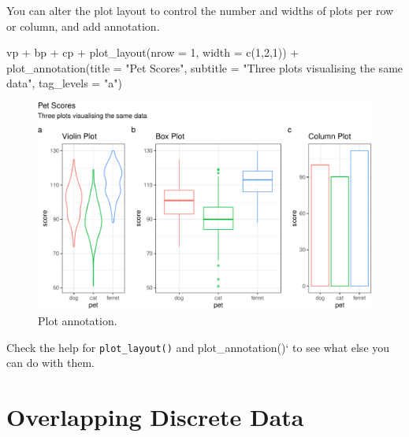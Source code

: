 \documentclass[
  oneside]{book}
\newenvironment{Shaded}{\begin{snugshade}}{\end{snugshade}}
\newcommand{\AttributeTok}[1]{\textcolor[rgb]{0.77,0.63,0.00}{#1}}
\newcommand{\DecValTok}[1]{\textcolor[rgb]{0.00,0.00,0.81}{#1}}
\newcommand{\FunctionTok}[1]{\textcolor[rgb]{0.00,0.00,0.00}{#1}}
\newcommand{\NormalTok}[1]{#1}
\newcommand{\SpecialCharTok}[1]{\textcolor[rgb]{0.00,0.00,0.00}{#1}}
\newcommand{\StringTok}[1]{\textcolor[rgb]{0.31,0.60,0.02}{#1}}
\begin{document}
You can alter the plot layout to control the number and widths of plots per row or column, and add annotation.

\begin{Shaded}
\begin{Highlighting}[]
\NormalTok{vp }\SpecialCharTok{+}\NormalTok{ bp }\SpecialCharTok{+}\NormalTok{ cp }\SpecialCharTok{+} 
  \FunctionTok{plot\_layout}\NormalTok{(}\AttributeTok{nrow =} \DecValTok{1}\NormalTok{, }\AttributeTok{width =} \FunctionTok{c}\NormalTok{(}\DecValTok{1}\NormalTok{,}\DecValTok{2}\NormalTok{,}\DecValTok{1}\NormalTok{)) }\SpecialCharTok{+}
  \FunctionTok{plot\_annotation}\NormalTok{(}\AttributeTok{title =} \StringTok{"Pet Scores"}\NormalTok{,}
                  \AttributeTok{subtitle =} \StringTok{"Three plots visualising the same data"}\NormalTok{,}
                  \AttributeTok{tag\_levels =} \StringTok{"a"}\NormalTok{)}
\end{Highlighting}
\end{Shaded}

\begin{figure}

{\centering \includegraphics[width=0.9\linewidth]{images/patchwork-annotate-1} 

}

\caption{Plot annotation.}\label{fig:patchwork-annotate}
\end{figure}

\begin{try}
Check the help for \texttt{plot\_layout()} and plot\_annotation()` to see what else you can do with them.

\end{try}

\hypertarget{overlap}{%
\section{Overlapping Discrete Data}\label{overlap}}
\end{document}
